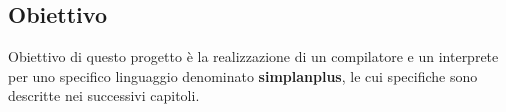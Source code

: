 \documentclass[../../main]{subfiles}
\begin{document}
\subsection{Obiettivo}
Obiettivo di questo progetto è la realizzazione di un compilatore e un interprete per uno specifico linguaggio denominato \textbf{simplanplus}, le cui specifiche sono descritte nei successivi capitoli.
\end{document}
